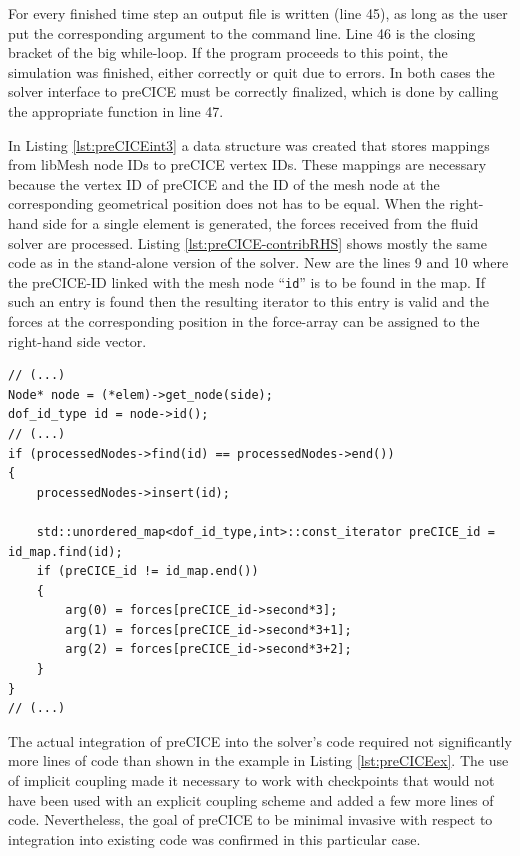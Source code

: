   For every finished time step an output file is written (line 45), as long as the user put the corresponding argument to the command line. Line 46 is the closing bracket of the big while-loop. If the program proceeds to this point, the simulation was finished, either correctly or quit due to errors. In both cases the solver interface to preCICE must be correctly finalized, which is done by calling the appropriate function in line 47.
   
   In Listing \ref{lst:preCICEint3} a data structure was created that stores mappings from libMesh node IDs to preCICE vertex IDs. These mappings are necessary because the vertex ID of preCICE and the ID of the mesh node at the corresponding geometrical position does not has to be equal. When the right-hand side for a single element is generated, the forces received from the fluid solver are processed. Listing \ref{lst:preCICE-contribRHS} shows mostly the same code as in the stand-alone version of the solver. New are the lines 9 and 10 where the preCICE-ID linked with the mesh node ``\texttt{id}'' is to be found in the map. If such an entry is found then the resulting iterator to this entry is valid and the forces at the corresponding position in the force-array can be assigned to the right-hand side vector.
\begin{lstlisting}[caption=Modification of contribRHS-function,label=lst:preCICE-contribRHS,keepspaces=true]
// (...)
Node* node = (*elem)->get_node(side);
dof_id_type id = node->id();
// (...)
if (processedNodes->find(id) == processedNodes->end())
{
	processedNodes->insert(id);

	std::unordered_map<dof_id_type,int>::const_iterator preCICE_id = id_map.find(id);
	if (preCICE_id != id_map.end())
	{
		arg(0) = forces[preCICE_id->second*3];
		arg(1) = forces[preCICE_id->second*3+1];
		arg(2) = forces[preCICE_id->second*3+2];
	}
}
// (...)
\end{lstlisting}   
   The actual integration of preCICE into the solver's code required not significantly more lines of code than shown in the example in Listing \ref{lst:preCICEex}. The use of implicit coupling made it necessary to work with checkpoints that would not have been used with an explicit coupling scheme and added a few more lines of code. Nevertheless, the goal of preCICE to be minimal invasive with respect to integration into existing code was confirmed in this particular case.
\newpage